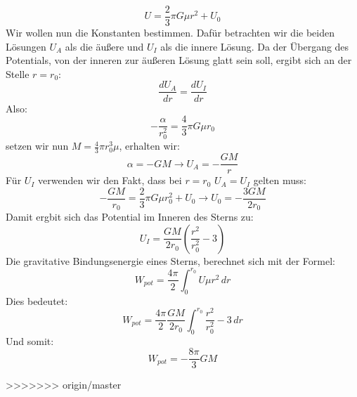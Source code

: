 \documentclass[a4paper]{article}
\begin{document}
\begin{equation}
    U=\frac{2}{3}\pi G\mu r^2+U_0
\end{equation}
Wir wollen nun die Konstanten bestimmen. Dafür betrachten wir die beiden Lösungen $U_A$ als die äußere und $U_I$ als die innere Lösung. Da der Übergang des Potentials, von der inneren zur äußeren Lösung glatt sein soll, ergibt sich an der Stelle $r=r_0$:
\begin{equation}
    \frac{dU_A}{dr}=\frac{dU_I}{dr}
\end{equation}
Also:
\begin{equation}
    -\frac{\alpha}{r_0^2}=\frac{4}{3}\pi G\mu r_0
\end{equation}
setzen wir nun $M=\frac{4}{3}\pi r_0^3\mu$, erhalten wir:
\begin{equation}
    \alpha=-GM\rightarrow U_A=-\frac{GM}{r}
\end{equation}
Für $U_I$ verwenden wir den Fakt, dass bei $r=r_0$ $U_A=U_I$ gelten muss:
\begin{equation}
    -\frac{GM}{r_0}=\frac{2}{3}\pi G\mu r_0^2+U_0\rightarrow U_0=-\frac{3GM}{2r_0}
\end{equation}
Damit ergbit sich das Potential im Inneren des Sterns zu:
\begin{equation}
    U_I=\frac{GM}{2r_0}(\frac{r^2}{r_0^2}-3)
\end{equation}
Die gravitative Bindungsenergie eines Sterns, berechnet sich mit der Formel:
\begin{equation}
    W_{pot}=\frac{4\pi}{2}\int_{0}^{r_0} U\mu r^2\, dr
\end{equation}
Dies bedeutet:
\begin{equation}
    W_{pot}=\frac{4\pi}{2}\frac{GM}{2r_0}\int_{0}^{r_0} \frac{r^2}{r_0^2}-3\, dr
\end{equation}
Und somit:
\begin{equation}
    W_{pot}=-\frac{8\pi}{3}GM
\end{equation}
\newline




>>>>>>> origin/master






\nocite{meinel}
\nocite{piotr}
\nocite{oloff}
\printbibliography
\end{document}
